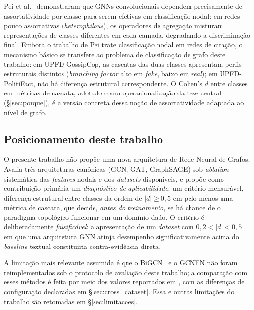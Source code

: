Pei et al.~\cite{pei2020geomgcn} demonstraram que GNNs convolucionais
dependem precisamente de assortatividade por classe para serem
efetivas em classifica\c{c}\~ao nodal: em redes pouco assortativas
(\emph{heterophilous}), os operadores de agrega\c{c}\~ao misturam
representa\c{c}\~oes de classes diferentes em cada camada, degradando
a discrimina\c{c}\~ao final. Embora o trabalho de Pei trate
classifica\c{c}\~ao nodal em redes de cita\c{c}\~ao, o mecanismo
b\'asico se transfere ao problema de classifica\c{c}\~ao de
grafo deste trabalho: em UPFD-GossipCop, as cascatas das duas classes apresentam
perfis estruturais distintos (\emph{branching factor} alto em
\emph{fake}, baixo em \emph{real}); em UPFD-PolitiFact, n\~ao h\'a
diferen\c{c}a estrutural correspondente. O Cohen's $d$ entre classes em
m\'etricas de cascata, adotado como operacionaliza\c{c}\~ao da
tese central (\S\ref{sec:porque}), \'e a vers\~ao concreta dessa
no\c{c}\~ao de assortatividade adaptada ao n\'ivel de grafo.

\subsection{Posicionamento deste trabalho}
\label{sec:posicionamento}

O presente trabalho n\~ao prop\~oe uma nova arquitetura de Rede
Neural de Grafos. Avalia tr\^es arquiteturas can\^onicas (GCN, GAT,
GraphSAGE) sob \emph{ablation} sistem\'atica das \emph{features} nodais
e dos \emph{datasets} dispon\'iveis, e prop\~oe como contribui\c{c}\~ao
prim\'aria um \emph{diagn\'ostico de aplicabilidade}: um crit\'erio
mensur\'avel, diferen\c{c}a estrutural entre classes da ordem de
$|d| \geq 0{,}5$ em pelo menos uma m\'etrica de cascata, que decide,
\emph{antes do treinamento}, se h\'a chance de o paradigma topol\'ogico
funcionar em um dom\'inio dado. O crit\'erio \'e deliberadamente
\emph{falsific\'avel}: a apresenta\c{c}\~ao de um \emph{dataset} com
$0{,}2 < |d| < 0{,}5$ em que uma arquitetura GNN atinja desempenho
significativamente acima do \emph{baseline} textual constituiria
contra-evid\^encia direta.

A limita\c{c}\~ao mais relevante assumida \'e que o BiGCN~\cite{bian2020bigcn}
e o GCNFN n\~ao foram reimplementados sob o protocolo de
avalia\c{c}\~ao deste trabalho; a compara\c{c}\~ao com esses m\'etodos \'e feita por
meio dos valores reportados em \cite{dou2021upfd}, com as diferen\c{c}as
de configura\c{c}\~ao declaradas em \S\ref{sec:cross_dataset}. Essa
e outras limita\c{c}\~oes do trabalho s\~ao retomadas em
\S\ref{sec:limitacoes}.
